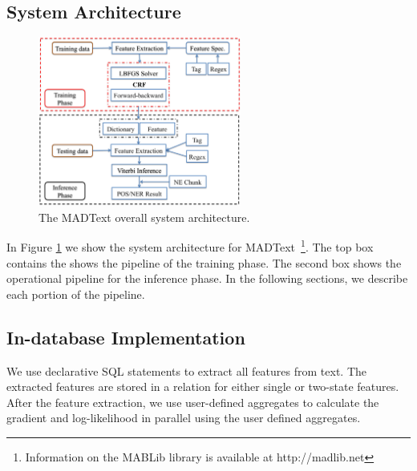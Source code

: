 \documentclass[11pt,letterpaper]{article}
\begin{document}
\subsection{System Architecture}
\begin{figure}
\centering
\includegraphics[height=15em]{system.png}
\caption{The MADText overall system architecture.}
\label{fig:systemarch}
\end{figure}

In Figure \ref{fig:systemarch} we show the system architecture for MADText~\footnote{Information on the MABLib library is available at http://madlib.net}. 
The top box contains the shows  the pipeline of the training phase. 
The second box shows the operational pipeline for the inference phase.
In the following sections, we describe each portion of the pipeline.

\subsection{In-database Implementation}
We use declarative SQL statements to extract all features from text.
The extracted features are stored in a relation for either single or two-state features.
After the feature extraction, we use user-defined aggregates to calculate the gradient and log-likelihood in parallel using the user defined aggregates.
\end{document}
